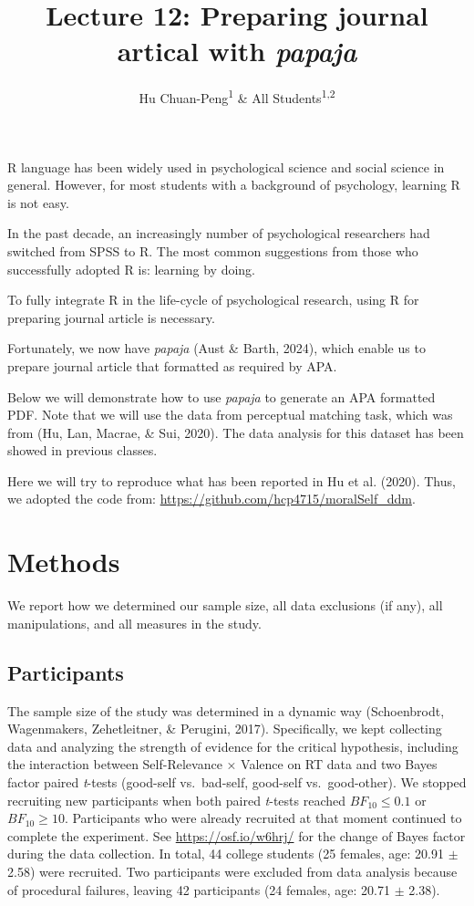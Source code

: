 \documentclass[
  man]{apa6}
\title{Lecture 12: Preparing journal artical with \emph{papaja}}
\author{Hu Chuan-Peng\textsuperscript{1} \& All Students\textsuperscript{1,2}}
\date{}
\affiliation{\vspace{0.5cm}\textsuperscript{1} Nanjing Normal Unviersity\\\textsuperscript{2} Collaborators' Affiliations}
\begin{document}
\maketitle

R language has been widely used in psychological science and social science in general. However, for most students with a background of psychology, learning R is not easy.

In the past decade, an increasingly number of psychological researchers had switched from SPSS to R. The most common suggestions from those who successfully adopted R is: learning by doing.

To fully integrate R in the life-cycle of psychological research, using R for preparing journal article is necessary.

Fortunately, we now have \emph{papaja} (Aust \& Barth, 2024), which enable us to prepare journal article that formatted as required by APA.

Below we will demonstrate how to use \emph{papaja} to generate an APA formatted PDF. Note that we will use the data from perceptual matching task, which was from (Hu, Lan, Macrae, \& Sui, 2020). The data analysis for this dataset has been showed in previous classes.

Here we will try to reproduce what has been reported in Hu et al. (2020). Thus, we adopted the code from: \url{https://github.com/hcp4715/moralSelf_ddm}.

\section{Methods}\label{methods}

We report how we determined our sample size, all data exclusions (if any), all manipulations, and all measures in the study.

\subsection{Participants}\label{participants}

The sample size of the study was determined in a dynamic way (Schoenbrodt, Wagenmakers, Zehetleitner, \& Perugini, 2017). Specifically, we kept collecting data and analyzing the strength of evidence for the critical hypothesis, including the interaction between Self-Relevance × Valence on RT data and two Bayes factor paired \emph{t}-tests (good-self vs.~bad-self, good-self vs.~good-other). We stopped recruiting new participants when both paired \emph{t}-tests reached \(BF_{10} \le 0.1\) or \(BF_{10} \ge 10\). Participants who were already recruited at that moment continued to complete the experiment. See \url{https://osf.io/w6hrj/} for the change of Bayes factor during the data collection. In total, 44 college students (25 females, age: 20.91 \(\pm\) 2.58) were recruited. Two participants were excluded from data analysis because of procedural failures, leaving 42 participants (24 females, age: 20.71 \(\pm\) 2.38).
\end{document}
